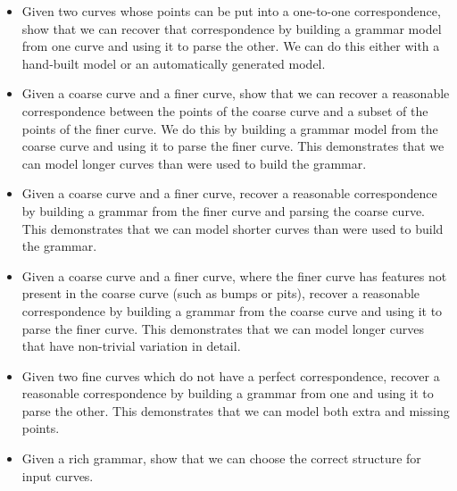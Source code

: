 \begin{itemize}
\begin{itemize}
  \item Given two curves whose points can be put into a one-to-one
    correspondence, show that we can recover that correspondence by
    building a grammar model from one curve and using it to parse the
    other. We can do this either with a hand-built model or an
    automatically generated model.
  \item Given a coarse curve and a finer curve, show that we can recover a
    reasonable correspondence between the points of the coarse curve
    and a subset of the points of the finer curve. We do this by
    building a grammar model from the coarse curve and using it to
    parse the finer curve. This demonstrates that we can model longer
    curves than were used to build the grammar. 
  \item Given a coarse curve and a finer curve, recover a reasonable
    correspondence by building a grammar from the finer curve and
    parsing the coarse curve. This demonstrates that we can model
    shorter curves than were used to build the grammar.
  \item Given a coarse curve and a finer curve, where the finer curve has
    features not present in the coarse curve (such as bumps or pits),
    recover a reasonable correspondence by building a grammar from the
    coarse curve and using it to parse the finer curve. This
    demonstrates that we can model longer curves that have non-trivial
    variation in detail.
  \item Given two fine curves which do not have a perfect correspondence,
    recover a reasonable correspondence by building a grammar from one
    and using it to parse the other. This demonstrates that we can
    model both extra and missing points.
  \item Given a rich grammar, show that we can choose the correct
    structure for input curves.
\end{itemize}

\end{itemize}

